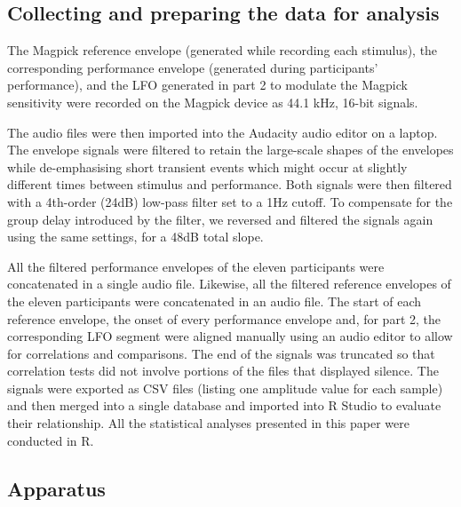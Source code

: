 \documentclass[sigconf]{nimeart}
\begin{document}
\subsection{Collecting and preparing the data for analysis}\label{collecting-and-preparing-the-data-for-analysis}

The Magpick reference envelope (generated while recording each stimulus), the corresponding performance envelope (generated during participants' performance), and the LFO generated in part 2 to modulate the Magpick sensitivity were recorded on the Magpick device as 44.1 kHz, 16-bit signals.

The audio files were then imported into the Audacity \cite{martin2014audacity} audio editor on a laptop. The envelope signals were filtered to retain the large-scale shapes of the envelopes while de-emphasising short transient events which might occur at slightly different times between stimulus and performance. Both signals were then filtered with a 4th-order (24dB) low-pass filter set to a 1Hz cutoff. To compensate for the group delay introduced by the filter, we reversed and filtered the signals again using the same settings, for a 48dB total slope.

All the filtered performance envelopes of the eleven participants were concatenated in a single audio file. Likewise, all the filtered reference envelopes of the eleven participants were concatenated in an audio file. The start of each reference envelope, the onset of every performance envelope and, for part 2, the corresponding LFO segment were aligned manually using an audio editor to allow for correlations and comparisons. The end of the signals was truncated so that correlation tests did not involve portions of the files that displayed silence. The signals were exported as CSV files (listing one amplitude value for each sample) and then merged into a single database and imported into R Studio \cite{racine2012rstudio} to evaluate their relationship. All the statistical analyses presented in this paper were conducted in R.

\subsection{Apparatus}\label{apparatus}
\end{document}
